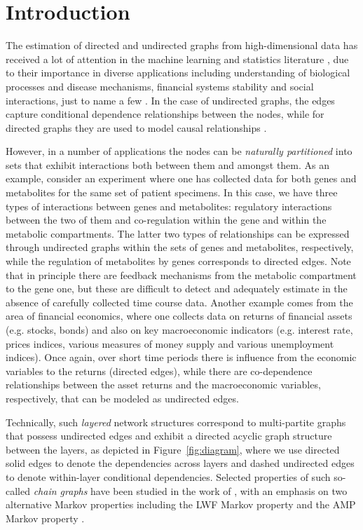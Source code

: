 \section{Introduction}

The estimation of directed and undirected graphs from high-dimensional data has received a lot of attention in the machine
learning and statistics literature \cite[e.g., see][and references therein]{buhlmann2011statistics}, due to
their importance in diverse applications including understanding of biological processes and disease mechanisms, financial
systems stability and social interactions, just to name a few \citep{sachs2005causal,wang2007local,sobel2000causal}. In the case of undirected graphs, the edges capture
conditional dependence relationships between the nodes, while for directed graphs they are used to model causal relationships \citep{buhlmann2011statistics}. 

However, in a number of applications the nodes can be {\em naturally partitioned} into sets that exhibit interactions both between
them and amongst them. As an example, consider an experiment where one has collected data for both genes and metabolites for
the same set of patient specimens. In this case, we have three types of interactions between genes and metabolites: regulatory interactions between the two of them and co-regulation within the gene and within the metabolic compartments. The latter two types of relationships can be expressed through undirected graphs within the sets of genes and metabolites, respectively, while
the regulation of metabolites by genes corresponds to directed edges. Note that in principle there are feedback mechanisms from the
metabolic compartment to the gene one, but these are difficult to detect and adequately estimate in the absence of carefully collected time course data. Another example comes from the area of financial economics, where one collects data on returns of financial assets (e.g. stocks, bonds) and also on key macroeconomic indicators (e.g. interest rate, prices indices, various
measures of money supply and various unemployment indices). Once again, over short time periods there is influence from
the economic variables to the returns (directed edges), while there are co-dependence relationships between the asset returns and the macroeconomic variables, respectively, that can be modeled as undirected edges.

Technically, such {\em layered} network structures correspond to multi-partite graphs that possess undirected edges and exhibit a 
directed acyclic graph structure between the layers, as depicted in Figure~\ref{fig:diagram}, where we use directed solid edges to denote the dependencies across layers and dashed undirected edges to denote within-layer conditional dependencies. 
 Selected properties of such so-called {\em chain graphs} have been studied in the work of \citet{drton2008sinful}, with an emphasis on two alternative Markov properties including the LWF Markov property \citep{lauritzen1989graphical,frydenberg1990chain} and the AMP Markov property \citep{andersson2001alternative}. 

